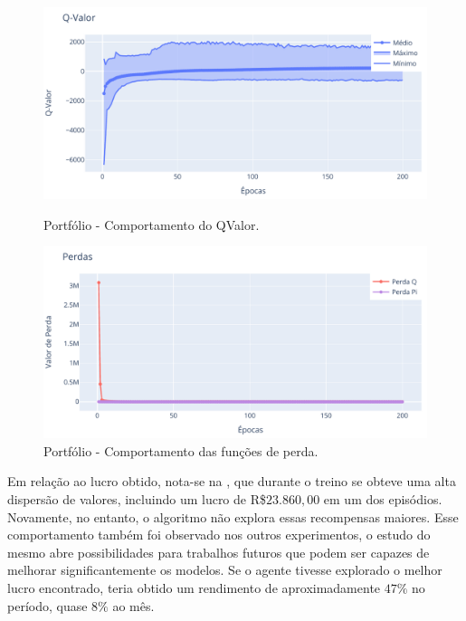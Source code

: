 \begin{figure}[htbp]
    \centering 
    \begin{minipage}[b]{0.45\linewidth}
        \includegraphics[width=\linewidth]{img/ddpg/all/clean/qval}
        \caption{Portfólio - Comportamento do QValor.} 
        \label{all_clean_qval}
    \end{minipage}
    \quad
    \begin{minipage}[b]{0.45\linewidth}
        \includegraphics[width=\linewidth]{img/ddpg/all/clean/loss}
        \caption{Portfólio - Comportamento das funções de perda.}
        \label{all_clean_loss}
    \end{minipage}
\end{figure}

Em relação ao lucro obtido, nota-se na , que durante o treino se obteve uma alta dispersão de valores, incluindo um lucro de R\$$23.860,00$ em um dos episódios. Novamente, no entanto, o algoritmo não explora essas recompensas maiores. Esse comportamento também foi observado nos outros experimentos, o estudo do mesmo abre possibilidades para trabalhos futuros que podem ser capazes de melhorar significantemente os modelos. Se o agente tivesse explorado o melhor lucro encontrado, teria obtido um rendimento de aproximadamente $47\%$ no período, quase $8\%$ ao mês.  

